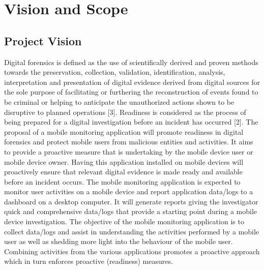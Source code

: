 \documentclass[hidelinks, 12pt, oneside]{article}
\begin{document}
	
	\tableofcontents
	\newpage
	\section{Vision and Scope}
	\subsection{Project Vision}
	\vspace{0.3 cm}
	  Digital forensics is defined as the use of scientifically derived and proven methods towards the preservation, collection, validation, identification, analysis, interpretation and presentation of digital evidence derived from digital sources for the sole purpose of facilitating or furthering the reconstruction of events found to be criminal or helping to anticipate the unauthorized actions shown to be disruptive to planned operations [3].
Readiness is considered as the process of being prepared for a digital investigation before an incident has occurred [2]. \newline\newline
The proposal of a mobile monitoring application will promote readiness in digital forensics and protect mobile users from malicious entities and activities. It aims to provide a proactive measure that is undertaking by the mobile device user or mobile device owner. Having this application installed on mobile devices will proactively ensure that relevant digital evidence is made ready and available before an incident occurs. The mobile monitoring application is expected to monitor user activities on a mobile device and report application data/logs to a dashboard on a desktop computer. It will generate reports giving the investigator quick and comprehensive data/logs that provide a starting point during a mobile device investigation. \newline\newline
The objective of the mobile monitoring application is to collect data/logs and assist in understanding the activities performed by a mobile user as well as shedding more light into the behaviour of the mobile user. Combining activities from the various applications promotes a proactive approach which in turn enforces proactive (readiness) measures. 
\end{document}
